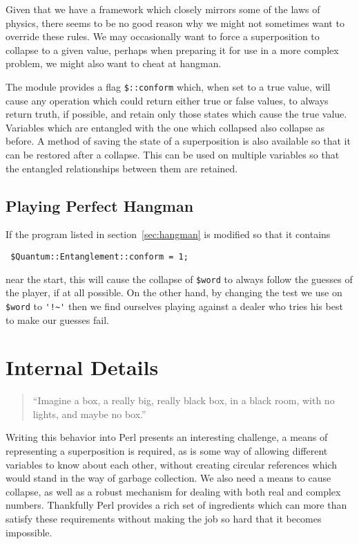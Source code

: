 \documentclass{article}      %
\newcommand{\pvar}[1]{\texttt{\$#1}} %
\begin{document}
Given that we have a framework which closely mirrors some of the laws
of physics, there seems to be no good reason why we might not
sometimes want to override these rules.  We may occasionally want to
force a superposition to collapse to a given value, perhaps when
preparing it for use in a more complex problem, we might also want to
cheat at hangman.

The module provides a flag \pvar{::conform} which,
when set to a true value, will cause any operation which could return
either true or false values, to always return truth, if possible, and
retain only those states which cause the true value. Variables which
are entangled with the one which collapsed also collapse as before.
A method of saving the state of a superposition is also available
so that it can be restored after a collapse. This can be used on
multiple variables so that the entangled relationships between them
are retained.

\subsection{Playing Perfect Hangman}

If the program listed in section~\ref{sec:hangman} is modified so that
it contains
\begin{verbatim}
 $Quantum::Entanglement::conform = 1;
\end{verbatim} %
near the start, this will cause the collapse of \pvar{word} to always
follow the guesses of the player, if at all possible.  On the other
hand, by changing the test we use on \pvar{word} to \verb|'!~'| then
we find ourselves playing against a dealer who tries his best to make
our guesses fail.

\section{Internal Details}

\begin{quote}``Imagine a box, a really big, really black box, in a
black room, with no lights, and maybe no box.''\end{quote}

Writing this behavior into Perl presents an interesting challenge, a
means of representing a superposition is required, as is some way of
allowing different variables to know about each other, without
creating circular references which would stand in the way of garbage
collection.  We also need a means to cause collapse, as well as a
robust mechanism for dealing with both real and complex numbers.
Thankfully Perl provides a rich set of ingredients which can more than
satisfy these requirements without making the job so hard that it becomes
impossible.
\end{document}
